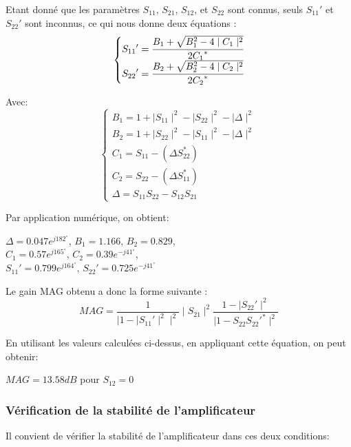 \documentclass[french]{article}
\begin{document}
Etant donné que les paramètres $S_{11}$, $S_{21}$, $S_{12}$, et $S_{22}$ sont connus, seuls ${S_{11}}'$ et ${S_{22}}'$ sont inconnus, ce qui nous donne deux équations :
\begin{equation}
	\left\{\begin{matrix}
		{S_{11}}'=\cfrac{B_{1}+\sqrt{B_{1}^{2}-4\mid C_{1}\mid^{2}}}{2{C_{1}}^\ast}\\
		{S_{22}}'=\cfrac{B_{2}+\sqrt{B_{2}^{2}-4\mid C_{2}\mid^{2}}}{2{C_{2}}^\ast}
	\end{matrix}\right.
\end{equation}

Avec:
\begin{equation}
	\left\{\begin{matrix}
		B_{1}=1+\mid S_{11}\mid^{2}-\mid S_{22}\mid^{2}-\mid \Delta \mid^{2}\\
		B_{2}=1+\mid S_{22}\mid^{2}-\mid S_{11}\mid^{2}-\mid \Delta \mid^{2}\\
		C_{1}=S_{11}-\left(\Delta S_{22}^\ast\right)\\
		C_{2}=S_{22}-\left(\Delta S_{11}^\ast\right)\\
		\Delta=S_{11}S_{22}-S_{12}S_{21}
	\end{matrix}\right.
\end{equation}

Par application numérique, on obtient:

{\centering
$\Delta=0.047e^{j182^{\circ}}$, $B_{1}=1.166$, $B_{2}=0.829$,\\ $C_{1}=0.57e^{j165^{\circ}}$, $C_{2}=0.39e^{-j41^{\circ}}$,\\ $S_{11}'=0.799e^{j164^{\circ}}$, $S_{22}'=0.725e^{-j41^{\circ}}$\\
}

Le gain MAG obtenu a donc la forme suivante :
\begin{equation}
	MAG=\frac{1}{\mid 1-\mid S_{11}'\mid^{2}\mid^{2}}\mid S_{21}\mid^{2}\frac{1-\mid S_{22}'\mid^{2}}{\mid 1-S_{22}S_{22}'^{\ast}\mid^{2}}
\end{equation}

En utilisant les valeurs calculées ci-dessus, en appliquant cette équation, on peut obtenir:

{\centering
	$MAG=13.58 dB$ pour $S_{12}=0$\\
}

\subsubsection{Vérification de la stabilité de l’amplificateur}
Il convient de vérifier la stabilité de l’amplificateur dans ces deux conditions:
\end{document}
